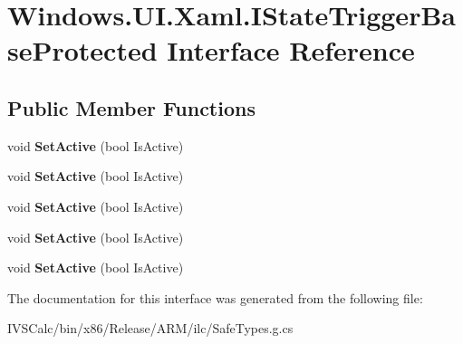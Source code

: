 \hypertarget{interface_windows_1_1_u_i_1_1_xaml_1_1_i_state_trigger_base_protected}{}\section{Windows.\+U\+I.\+Xaml.\+I\+State\+Trigger\+Base\+Protected Interface Reference}
\label{interface_windows_1_1_u_i_1_1_xaml_1_1_i_state_trigger_base_protected}
\subsection*{Public Member Functions}
\begin{DoxyCompactItemize}
\item 
\mbox{\label{interface_windows_1_1_u_i_1_1_xaml_1_1_i_state_trigger_base_protected_aaf610f6dee7db79fbd17b4699cf4a94c}} 
void {\bfseries Set\+Active} (bool Is\+Active)
\item 
\mbox{\label{interface_windows_1_1_u_i_1_1_xaml_1_1_i_state_trigger_base_protected_aaf610f6dee7db79fbd17b4699cf4a94c}} 
void {\bfseries Set\+Active} (bool Is\+Active)
\item 
\mbox{\label{interface_windows_1_1_u_i_1_1_xaml_1_1_i_state_trigger_base_protected_aaf610f6dee7db79fbd17b4699cf4a94c}} 
void {\bfseries Set\+Active} (bool Is\+Active)
\item 
\mbox{\label{interface_windows_1_1_u_i_1_1_xaml_1_1_i_state_trigger_base_protected_aaf610f6dee7db79fbd17b4699cf4a94c}} 
void {\bfseries Set\+Active} (bool Is\+Active)
\item 
\mbox{\label{interface_windows_1_1_u_i_1_1_xaml_1_1_i_state_trigger_base_protected_aaf610f6dee7db79fbd17b4699cf4a94c}} 
void {\bfseries Set\+Active} (bool Is\+Active)
\end{DoxyCompactItemize}


The documentation for this interface was generated from the following file\+:\begin{DoxyCompactItemize}
\item 
I\+V\+S\+Calc/bin/x86/\+Release/\+A\+R\+M/ilc/Safe\+Types.\+g.\+cs\end{DoxyCompactItemize}
